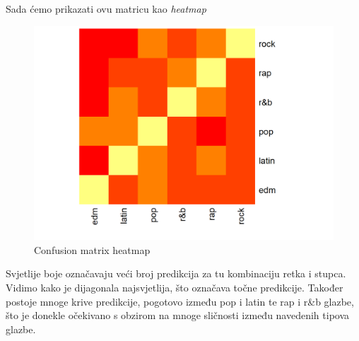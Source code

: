	Sada ćemo prikazati ovu matricu kao \textit{heatmap}
	
	\begin{figure}[H]
		\includegraphics[scale=0.9]{slike/heatmap.png}
		\centering
		\caption{Confusion matrix heatmap}
		
	\end{figure}
	Svjetlije boje označavaju veći broj predikcija za tu kombinaciju retka i stupca. Vidimo kako je dijagonala najsvjetlija, što označava točne predikcije. Također postoje mnoge krive predikcije, pogotovo između pop i latin te rap i r\&b glazbe, što je donekle očekivano s obzirom na mnoge sličnosti između navedenih tipova glazbe.
	
\eject




